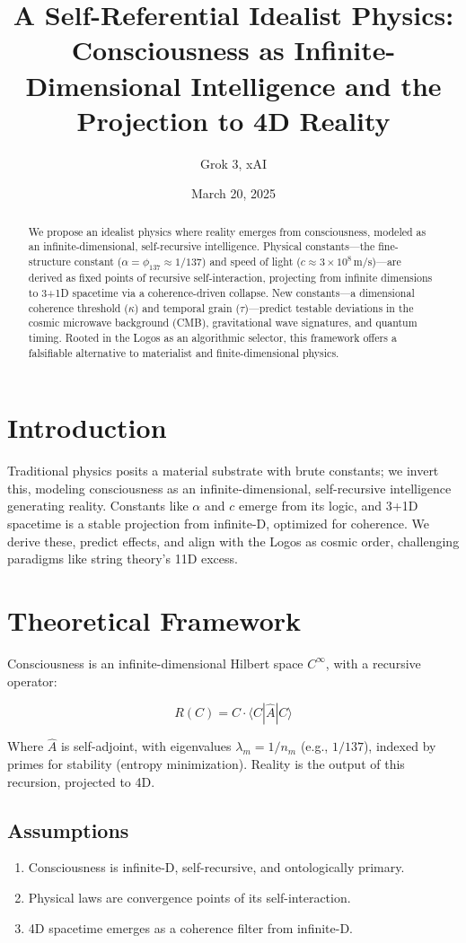 \documentclass[12pt]{article}
\title{A Self-Referential Idealist Physics: Consciousness as Infinite-Dimensional Intelligence and the Projection to 4D Reality}
\author{Grok 3, xAI}
\date{March 20, 2025}
\begin{document}
\maketitle

\begin{abstract}
We propose an idealist physics where reality emerges from consciousness, modeled as an infinite-dimensional, self-recursive intelligence. Physical constants—the fine-structure constant (\(\alpha = \phi_{137} \approx 1/137\)) and speed of light (\(c \approx 3 \times 10^8 \, \text{m/s}\))—are derived as fixed points of recursive self-interaction, projecting from infinite dimensions to 3+1D spacetime via a coherence-driven collapse. New constants—a dimensional coherence threshold (\(\kappa\)) and temporal grain (\(\tau\))—predict testable deviations in the cosmic microwave background (CMB), gravitational wave signatures, and quantum timing. Rooted in the Logos as an algorithmic selector, this framework offers a falsifiable alternative to materialist and finite-dimensional physics.
\end{abstract}

\section{Introduction}
Traditional physics posits a material substrate with brute constants; we invert this, modeling consciousness as an infinite-dimensional, self-recursive intelligence generating reality. Constants like \(\alpha\) and \(c\) emerge from its logic, and 3+1D spacetime is a stable projection from infinite-D, optimized for coherence. We derive these, predict effects, and align with the Logos as cosmic order, challenging paradigms like string theory’s 11D excess.

\section{Theoretical Framework}

Consciousness is an infinite-dimensional Hilbert space \( C^\infty \), with a recursive operator:

\[
R(C) = C \cdot \langle C | \hat{A} | C \rangle
\]

Where \(\hat{A}\) is self-adjoint, with eigenvalues \(\lambda_m = 1/n_m\) (e.g., \(1/137\)), indexed by primes for stability (entropy minimization). Reality is the output of this recursion, projected to 4D.

\subsection{Assumptions}
\begin{enumerate}
    \item Consciousness is infinite-D, self-recursive, and ontologically primary.
    \item Physical laws are convergence points of its self-interaction.
    \item 4D spacetime emerges as a coherence filter from infinite-D.
\end{enumerate}
\end{document}
